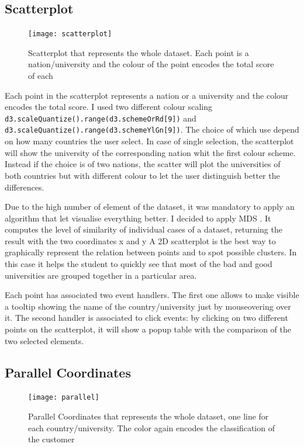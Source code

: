 \documentclass[journal]{vgtc}                %
\begin{document}
\subsection{Scatterplot}
\begin{figure}[h]
 \centering
  \texttt{[image: scatterplot]}
  \caption{Scatterplot that represents the whole dataset. Each point is a nation/university and the colour of the point encodes the total score of each}
  \label{scatterplot}
\end{figure}
Each point in the scatterplot represents a nation or a university and the colour encodes the total score. I used two different colour scaling  \texttt{d3.scaleQuantize().range(d3.schemeOrRd[9])}\cite{d3:2018}  and  \texttt{d3.scaleQuantize().range(d3.schemeYlGn[9])}\cite{d3:2018}. The choice of which use depend on how many countries the user select. In case of single selection, the scatterplot will show the university of the corresponding nation whit the first colour scheme. Instead if the choice is of two nations, the scatter will plot the universities of both countries but with different colour to let the user distinguish better the differences.


Due to the high number of element of the dataset, it was mandatory to apply an algorithm that let visualise everything better. I decided to apply MDS \cite{sklearn:2018} . It computes the level of similarity of individual cases of a dataset, returning the result with the two coordinates x and y
A 2D scatterplot is the best way to graphically represent the relation between points and to spot possible clusters. In this case it helps the student to quickly see that most of the bad and good universities are grouped together in a particular area.

Each point has associated two event handlers. The first one allows to make visible a tooltip showing the name of the country/university just by mouseovering over it.
The second handler is associated to click events: by clicking on two different points on the scatterplot, it will show a popup table with the comparison of the two selected elements.

\subsection{Parallel Coordinates}
\begin{figure}[h]
  \centering
  \texttt{[image: parallel]}
  \caption{Parallel Coordinates that represents the whole dataset, one line for each country/university. The color again encodes the classification of the customer}
  \label{parallel}
\end{figure}
\end{document}
